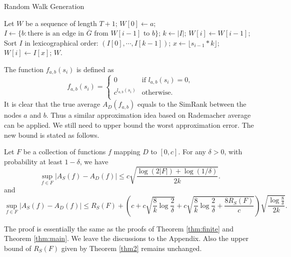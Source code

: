 \documentclass{article}
\begin{document}
\begin{algorithm}[!t]
\caption{\textsf{Random Walk Generation}}
\label{alg:rwg}
\renewcommand{\algorithmicrequire}{\textbf{Input:}}
\renewcommand{\algorithmicensure}{\textbf{Output:}}
\begin{algorithmic}
\State Let $W$ be a sequence of length $T+1$;
\State $W[0] \gets a$;
	\State $I \gets \{b: \textrm{there is an edge in $\overline{G}$ from $W[i-1]$ to $b$}\}$;
	\State $k \gets |I|$;
		\State $W[i] \gets W[i-1]$;
	\Else
		\State Sort $I$ in lexicographical order: $(I[0],\cdots,I[k-1])$;
		\State $x \gets \lfloor s_{i-1} * k \rfloor$;
		\State $W[i] \gets I[x]$;
	\EndIf
\EndFor
{} $W$.
\end{algorithmic}
\end{algorithm}

The function $f_{a,b}(s_i)$ is defined as 
$$f_{a,b}(s_i) =\begin{cases}
0 & \textrm{if $l_{a,b}(s_i)=0$,} \\
c^{l_{a,b}(s_i)} & \textrm{otherwise}.\\
\end{cases}$$
It is clear that the true average $A_D(f_{a,b})$ equals to the SimRank between the nodes $a$ and $b$. Thus a similar approximation idea based on Rademacher average can be applied. We still need to upper bound the worst approximation error. The new bound is stated as follows.

\begin{theorem}
\label{thm:new}
Let $F$ be a collection of functions $f$ mapping $D$ to $[0,c]$. 
For any $\delta>0$, with probability at least $1-\delta$, we have
$$\sup_{f\in F} | A_S(f) - A_D(f) | \leq c\sqrt{\frac{\log(2|F|) + \log(1/\delta)}{2k}}.$$
and 
$$\sup_{f\in F}|A_S(f) - A_D(f)| \leq R_S(F) + \left(c+c\sqrt{\frac{8}{k}\log \frac{2}{\delta}} + c\sqrt{\frac{8}{k}\log \frac{2}{\delta} + \frac{8R_S(F)}{c}}\right)\sqrt{\frac{\log \frac{8}{\delta}}{2k}}.$$
\end{theorem}
The proof is essentially the same as the proofs of Theorem \ref{thm:finite} and Theorem \ref{thm:main}. We leave the discussions to the Appendix. Also the upper bound of $R_S(F)$ given by Theorem \ref{thm2} remains unchanged.
\end{document}
